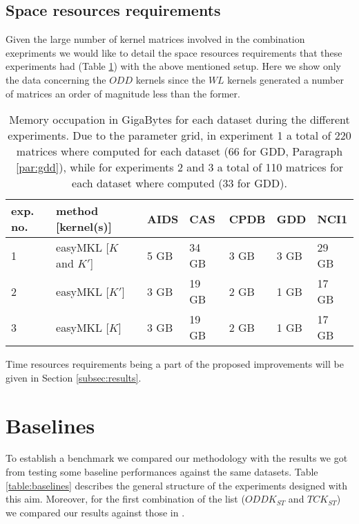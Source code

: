 \subsection{Space resources requirements}
Given the large number of kernel matrices involved in the combination exepriments
we would like to detail the space resources requirements that these experiments
had (Table \ref{table:space}) with the above mentioned setup.
Here we show only the data concerning the $ODD$ kernels since the $WL$ kernels
generated a number of matrices an order of magnitude less than the former.

\begin{table}[ht]
    \centering
    \begin{tabular}{|l|l|l|l|l|l|l|}
        \hline
        exp. no. & method [kernel(s)] & AIDS & CAS & CPDB & GDD & NCI1 \\
        \hline
        1 & easyMKL [$K$ and $K'$] & 5 GB & 34 GB & 3 GB & 3 GB & 29 GB \\
        \hline
        2 & easyMKL [$K'$] & 3 GB & 19 GB & 2 GB & 1 GB & 17 GB \\
        \hline
        3 & easyMKL [$K$] & 3 GB & 19 GB & 2 GB & 1 GB & 17 GB \\
        \hline
    \end{tabular}
    \caption{Memory occupation in GigaBytes for each dataset during the different
    experiments. Due to the parameter grid, in experiment 1 a total of 220 matrices
    where computed for each dataset (66 for GDD, Paragraph \ref{par:gdd}), while
    for experiments 2 and 3 a total of 110 matrices for each dataset where computed
    (33 for GDD).}
    \label{table:space}
\end{table}

Time resources requirements being a part of the proposed improvements will be given
in Section \ref{subsec:results}.

\section{Baselines}
To establish a benchmark we compared our methodology with the results we got
from testing some baseline performances against the same datasets.
Table \ref{table:baselines} describes the general structure of the experiments
designed with this aim.
Moreover, for the first combination of the list ($ODDK_{ST}$ and $TCK_{ST}$)
we compared our results against those in \cite{gmkl}.

